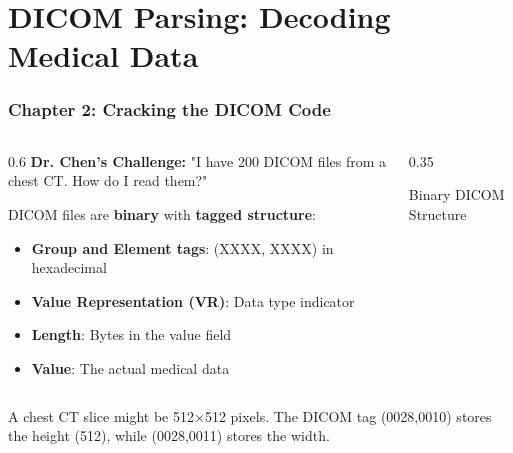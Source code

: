 \section{DICOM Parsing: Decoding Medical Data}

\begin{frame}
\frametitle{Chapter 2: Cracking the DICOM Code}

\begin{columns}[T]
\begin{column}{0.6\textwidth}
  \textbf{Dr. Chen's Challenge:} "I have 200 DICOM files from a chest CT. How do I read them?"
  
  \vspace{0.5cm}
  DICOM files are \textbf{binary} with \textbf{tagged structure}:
  \begin{itemize}
    \item \textbf{Group and Element tags}: (XXXX, XXXX) in hexadecimal
    \item \textbf{Value Representation (VR)}: Data type indicator
    \item \textbf{Length}: Bytes in the value field
    \item \textbf{Value}: The actual medical data
  \end{itemize}
\end{column}
\begin{column}{0.35\textwidth}
  \begin{center}
    \vspace{0.3cm}
    {\small\color{medicalgray}Binary DICOM Structure}
  \end{center}
\end{column}
\end{columns}

A chest CT slice might be 512×512 pixels. The DICOM tag (0028,0010) stores the height (512), while (0028,0011) stores the width.
\end{frame}

